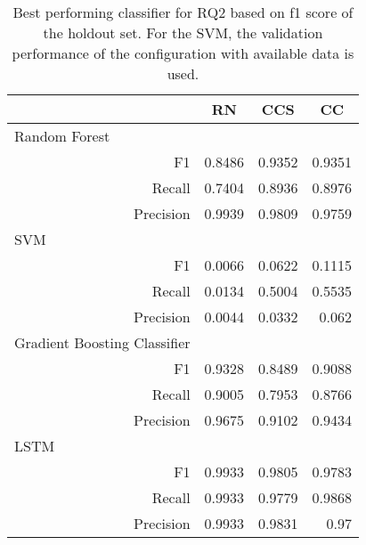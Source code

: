 \begin{table}[ht]
    \centering
    \begin{tabular}{rrrr}
    \toprule
    \multicolumn{1}{l}{}                             & \multicolumn{1}{c}{RN}         & \multicolumn{1}{c}{CCS} & \multicolumn{1}{c}{CC} \\ \midrule
    \multicolumn{1}{l}{Random Forest}                &  &            &              \\
    F1                                               & 0.8486               & 0.9352     & 0.9351       \\
    Recall                                           & 0.7404               & 0.8936     & 0.8976       \\
    Precision                                        & 0.9939               & 0.9809     & 0.9759       \\ \midrule
    \multicolumn{1}{l}{SVM}                          &                      &            &              \\
    F1                                               &   0.0066             &  0.0622    &   0.1115     \\
    Recall                                           &   0.0134             &  0.5004    &   0.5535     \\
    Precision                                        &   0.0044             &  0.0332    &   0.062      \\ \midrule
    \multicolumn{1}{l}{Gradient Boosting Classifier} &                      &            &              \\
    F1                                               & 0.9328               & 0.8489     & 0.9088       \\
    Recall                                           & 0.9005               & 0.7953     & 0.8766       \\
    Precision                                        & 0.9675               & 0.9102     & 0.9434       \\ \midrule
    \multicolumn{1}{l}{LSTM}                         &                      &            &              \\
    F1                                               & 0.9933               & 0.9805     & 0.9783       \\
    Recall                                           & 0.9933               & 0.9779     & 0.9868       \\
    Precision                                        & 0.9933               & 0.9831     & 0.97       \\ \bottomrule
    \end{tabular}
    \caption[Best performing classifier for RQ2]{Best performing classifier for RQ2 based on f1 score of the holdout set. For the SVM, the validation performance of the configuration with available data is used.}
    \label{tab:rq2_best_classifier}
    \end{table}